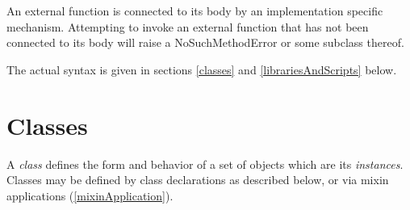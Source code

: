 \documentclass{article}
\newcommand{\code}[1]{{\sf #1}}
\begin{document}


\LMHash{}
An external function is connected to its body by an implementation specific mechanism. Attempting to invoke an external function that has not been connected to its body will raise a \code{NoSuchMethodError} or some subclass thereof.

\LMHash{}
The actual syntax is given in sections \ref{classes} and \ref{librariesAndScripts} below.

\section{Classes}

\LMHash{}
A {\em class} defines the form and behavior of a set of objects which are its {\em instances}.  Classes may be defined by class declarations as described below, or via mixin applications (\ref{mixinApplication}).
\end{document}
